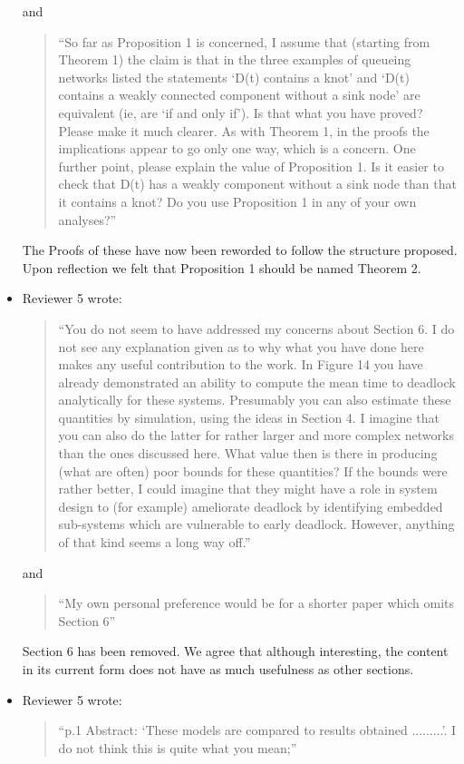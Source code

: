 \documentclass{article}
\begin{document}
\begin{itemize}
and

\begin{quote}
``So far as Proposition 1 is concerned, I assume that (starting from Theorem 1)
the claim is that in the three examples of queueing networks listed the
statements ‘D(t) contains a knot’ and ‘D(t) contains a weakly connected
component without a sink node’ are equivalent (ie, are ‘if and only if’). Is
that what you have proved? Please make it much clearer. As with Theorem 1, in
the proofs the implications appear to go only one way, which is a concern. One
further point, please explain the value of Proposition 1. Is it easier to check
that D(t) has a weakly component without a sink node than that it contains a
knot? Do you use Proposition 1 in any of your own analyses?''
\end{quote}

The Proofs of these have now been reworded to follow the structure proposed.
Upon reflection we felt that Proposition 1 should be named Theorem 2.


\item Reviewer 5 wrote:
\begin{quote}
``You do not seem to have addressed my concerns about Section 6. I do not see
any explanation given as to why what you have done here makes any useful
contribution to the work. In Figure 14 you have already demonstrated an ability
to compute the mean time to deadlock analytically for these systems.
Presumably you can also estimate these quantities by simulation, using the ideas
in Section 4. I imagine that you can also do the latter for rather larger and
more complex networks than the ones discussed here. What value then is there in
producing (what are often) poor bounds for these quantities? If the bounds were
rather better, I could imagine that they might have a role in system design to
(for example) ameliorate deadlock by identifying embedded sub-systems which are
vulnerable to early deadlock. However, anything of that kind seems a long way
off.''
\end{quote}

and

\begin{quote}
``My own personal preference would be for a shorter paper which omits Section
6''
\end{quote}

Section 6 has been removed. We agree that although interesting, the content in
its current form does not have as much usefulness as other sections.


\item Reviewer 5 wrote:
\begin{quote}
``p.1 Abstract: ‘These models are compared to results obtained .........’. I do
not think this is quite what you mean;''
\end{quote}


\end{itemize}
\end{document}
